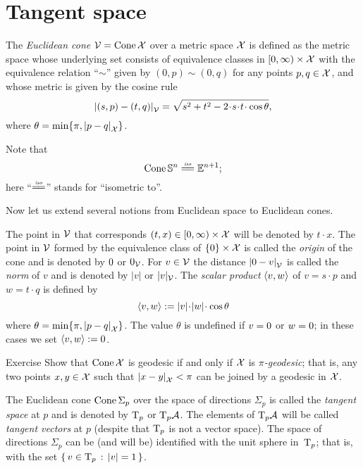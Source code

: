 \section{Tangent space}\label{sec: tangent space}

The \emph{Euclidean cone} $\mathcal{V}=\mathop{\rm Cone}\nolimits\mathcal{X}$
over a metric space $\mathcal{X}$
is defined as the metric space whose underlying set consists of
equivalence classes in
$[0,\infty)\times \mathcal{X}$ with the equivalence relation ``$\sim$'' given by $(0,p)\sim (0,q)$ for any points $p,q\in\mathcal{X}$,
and whose metric is given by the cosine rule
\[
\dist{(s,p)}{(t,q)}{\spc{V}} 
=
\sqrt{s^2+t^2-2\cdot s\cdot t\cdot \cos\theta},
\]
where $\theta= \min\{\pi, |{p}-{q}|_{\mathcal{X}}^{{}}\}$.

Note that
\[\Cone\SSS^n\iso\EE^{n+1};\]
here ``$\iso$'' stands for ``isometric to''. 

Now let us extend several notions from Euclidean space to Euclidean cones. 

The point in $\mathcal{V}$ that corresponds $(t,x)\in[0,\infty)\times \mathcal{X}$ will be denoted by $t\cdot x$.
The point in $\mathcal{V}$ formed by the equivalence class of $\{0\}\times\mathcal{X}$ is called the \emph{origin} of the cone and is denoted by $0$ or $0_{\mathcal{V}}$.
For $v\in\mathcal{V}$ the distance $|{0}-{v}|_{\mathcal{V}}^{{}}$ is called the \emph{norm} of $v$ and is denoted by $|v|$ or $|v|_{\mathcal{V}}$.
The \emph{scalar product} $\langle v,w\rangle$
of $v=s\cdot p$ and $w=t\cdot q$
is defined by 
\[\<v,w\>
\df |v|\cdot|w|\cdot\cos\theta
\]
where $\theta= \min\{\pi, |{p}-{q}|_{\mathcal{X}}^{{}}\}$.
The value $\theta$ is undefined if $v=0$ or $w=0$;
in these cases we set $\langle v,w\rangle\mathrel{:=}0$.

\begin{thm}{Exercise}\label{ex:geodesic-cone}
Show that $\mathop{\rm Cone}\nolimits\mathcal{X}$ is geodesic if and only if $\mathcal{X}$ is \emph{$\pi$-geodesic};
that is, any two points $x,y\in \mathcal{X}$ such that $|{x}-{y}|_{\mathcal{X}}^{{}}<\pi$ can be joined by a geodesic in $\mathcal{X}$.
\end{thm}

The Euclidean cone $\mathop{\rm Cone}\nolimits\Sigma_p$ over the space of directions $\Sigma_p$ is called the \emph{tangent space} at $p$ and is denoted by $\mathrm{T}_p$ or $\mathrm{T}_p\mathcal{A}$.
The elements of $\mathrm{T}_p\mathcal{A}$ will be called \emph{tangent vectors} at $p$
(despite that $\mathrm{T}_p$ is not a vector space).
The space of directions $\Sigma_p$ can be (and will be) identified with the unit sphere in~$\mathrm{T}_p$;
that is, with the set $\left\{\,{v\in\mathrm{T}_p}\,:\,{|v|=1}\,\right\}$.

